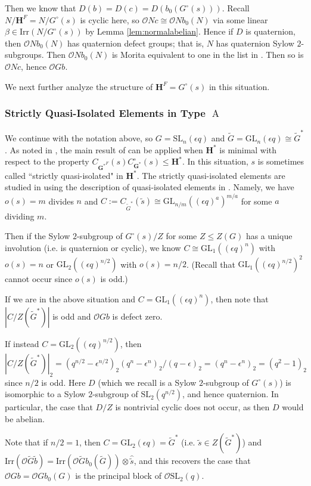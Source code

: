 \documentclass{amsart}
\theoremstyle{plain}\newtheorem{Theorem}{Theorem}[section]
\theoremstyle{plain}\newtheorem{Conjecture}[Theorem]{Conjecture}
\theoremstyle{plain}\newtheorem{Corollary}[Theorem]{Corollary}
\theoremstyle{plain}\newtheorem{Lemma}[Theorem]{Lemma}
\theoremstyle{plain}\newtheorem{Proposition}[Theorem]{Proposition}
\theoremstyle{definition}\newtheorem{Definition}[Theorem]{Definition}
\theoremstyle{definition}\newtheorem{Example}[Theorem]{Example}
\theoremstyle{definition}\newtheorem{Examples}[Theorem]{Examples}
\theoremstyle{definition}\newtheorem{Exercise}[Theorem]{Exercise}
\theoremstyle{definition}\newtheorem{Notation}[Theorem]{Notation}
\theoremstyle{definition}\newtheorem{Remark}[Theorem]{Remark}
\theoremstyle{definition}\newtheorem{Remarks}[Theorem]{Remarks}
\def\CO{{\mathcal{O}}}    \def\OPE{{\mathcal{O}(P\rtimes E)}}
\def\GL{\mathrm{GL}}
\def\Irr{\mathrm{Irr}}           \def\tenK{\otimes_K}
\def\SL{\mathrm{SL}}
\newcommand{\bG}{{\mathbf{G}}}
\newcommand{\bH}{{\mathbf{H}}}
\newcommand{\type}{\operatorname}
\newcommand{\wt}{\widetilde}
\newcommand{\tA}{\type{A}}
\newcommand{\cent} {C}
\newcommand{\zent} {Z}
\numberwithin{equation}{section}
\begin{document}
Then we know that $D(b)=D(c)=D(b_0(G^\circ(s)))$. Recall $N/\bH^F=N/G^\circ(s)$ is cyclic here, so $\CO N c\cong\CO N b_0(N)$ via some linear $\beta\in\Irr(N/G^\circ(s))$ by Lemma \ref{lem:normalabelian}. Hence if $D$ is quaternion, then $\CO N b_0(N)$ has quaternion defect groups; that is, $N$ has  quaternion Sylow $2$-subgroups. Then $\CO N b_0(N)$ is Morita equivalent to one in the list in \cite[Thm.~1.1]{kl20}. Then so is $\CO N c$, hence $\CO G b$.


We next further analyze the structure of $\bH^F=G^\circ(s)$ in this situation.

\subsubsection{Strictly Quasi-Isolated Elements in Type $\tA$}\label{sec:strictlyqi}
We continue with the notation above, so $G=\SL_n(\epsilon q)$ and $\wt{G}=\GL_n(\epsilon q)\cong \wt{G}^\ast$. As noted in \cite[Thm.~A]{Ruh22}, the main result of \cite{BR} 
can be applied when $\bH^\ast$ is minimal with respect to the property $\cent_{{\bG^\ast}^F}(s)\cent_{\bG^\ast}^\circ(s)\leq \bH^\ast$. 
In this situation, $s$ is sometimes called ``strictly quasi-isolated" in $\bH^\ast$. The strictly quasi-isolated elements are studied in \cite[Sec.~5.3]{Ruh22} using the description of quasi-isolated elements in \cite{bon}. Namely, we have $o(s)=m$ divides $n$ and   
 $C:=\cent_{\wt{G}^\ast}(\wt{s})\cong \GL_{n/m}((\epsilon q)^a)^{m/a}$ for some $a$ dividing $m$. 
 
 Then if the Sylow $2$-subgroup of $G^\circ(s)/Z$ for some $Z\leq \zent(G)$ has a unique involution (i.e. is quaternion or cyclic), 
we know $C\cong \GL_1((\epsilon q)^n)$ with $o(s)=n$ or $\GL_2((\epsilon q)^{n/2})$ with $o(s)=n/2$. (Recall that $\GL_1((\epsilon q)^{n/2})^2$ cannot occur since $o(s)$ is odd.)

If we are in the above situation and $C=\GL_1((\epsilon q)^n)$, then note that $|C/\zent(\wt G^\ast)|$ is odd and $\CO G b$ is defect zero.

If instead $C=\GL_2((\epsilon q)^{n/2})$, then $|C/\zent(\wt{G}^\ast)|_2=(q^{n/2}-\epsilon^{n/2})_2(q^n-\epsilon^n)_2/(q-\epsilon)_2=(q^n-\epsilon^n)_2=(q^2-1)_2$ since $n/2$ is odd. Here $D$ (which we recall is a Sylow $2$-subgroup of $G^\circ(s)$) is isomorphic to a Sylow $2$-subgroup of $\SL_2(q^{n/2})$, and hence quaternion. 
In particular, the case that $D/Z$ is nontrivial cyclic does not occur, as then $D$ would be abelian.


Note that if $n/2=1$, then $C=\GL_2(\epsilon q)=\wt{G}^\ast$ (i.e. $\wt{s}\in \zent(\wt{G}^\ast)$) and $\Irr(\CO\wt G \wt b) =\Irr(\CO \wt{G} b_0(\wt{G}))\otimes \hat{\wt{s}}$, and this recovers the case that $\CO G b=\CO G b_0(G)$ is the principal block of $\CO\SL_2(q)$.
\end{document}
